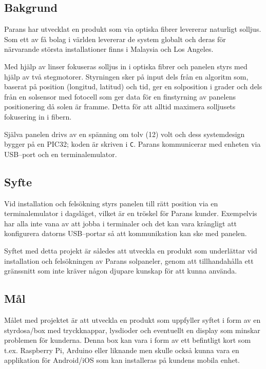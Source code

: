 \documentclass{article}
\begin{document}
        \subsection{Bakgrund} %
        \label{sub:bakgrund}
            Parans har utvecklat en produkt som via optiska fibrer levererar naturligt solljus. Som ett av få bolag i världen levererar de system globalt och deras för närvarande största installationer finns i Malaysia och Los Angeles.\bigskip

            \noindent Med hjälp av linser fokuseras solljus in i optiska fibrer och panelen styrs med hjälp av två stegmotorer. Styrningen sker på input dels från en algoritm som, baserat på position (longitud, latitud) och tid, ger en solposition i grader och dels från en solsensor med fotocell som ger data för en finstyrning av panelens positionering då solen är framme. Detta för att alltid maximera solljusets fokusering in i fibern.\bigskip

            \noindent Själva panelen drivs av en spänning om tolv (12) volt och dess systemdesign bygger på en PIC32; koden är skriven i \texttt{C}. Parans kommunicerar med enheten via USB--port och en terminalemulator. 
        
        \subsection{Syfte} %
        \label{sub:syfte}
            Vid installation och felsökning styrs panelen till rätt position via en terminalemulator i dagsläget, vilket är en tröskel för Parans kunder.  Exempelvis har alla inte vana av att jobba i terminaler och det kan vara krångligt att konfigurera datorns USB--portar så att kommunikation kan ske med panelen. \bigskip

            \noindent Syftet med detta projekt är således att utveckla en produkt som underlättar vid installation och felsökningen av Parans solpaneler, genom att tillhandahålla ett gränssnitt som inte kräver någon djupare kunskap för att kunna använda.
        
        \subsection{Mål} %
        \label{sub:mal}
          
          Målet med projektet är att utveckla en produkt som uppfyller syftet i form av en styr\-dosa/box med tryckknappar, lysdioder och eventuellt en display som minskar problemen för kunderna. Denna box kan vara i form av ett befintligt kort som t.ex. Raspberry Pi, Arduino eller liknande men skulle också kunna vara en applikation för Android/iOS som kan installeras på kundens mobila enhet.
\end{document}
